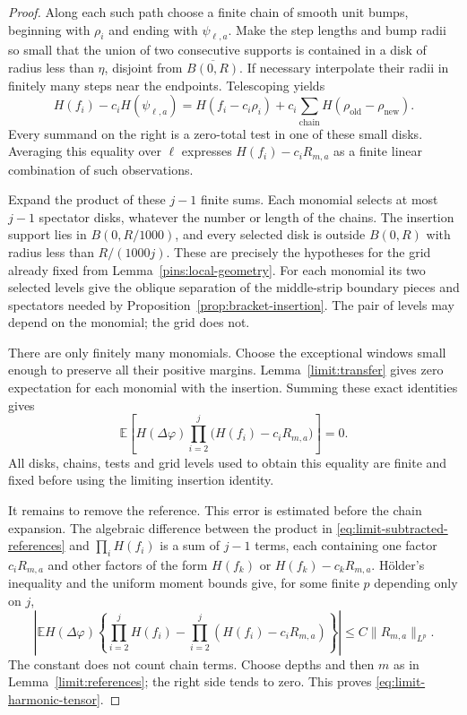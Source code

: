 \documentclass[11pt]{article}
\theoremstyle{definition}
\theoremstyle{remark}
\numberwithin{equation}{section}
\begin{document}
\begin{proof}
Along each such path choose a finite chain of smooth unit bumps,
beginning with \(\rho_i\) and ending with \(\psi_{\ell,a}\).
Make the step lengths and bump radii so small that the union of
two consecutive supports is contained in a disk of radius less
than \(\eta\), disjoint from \(\overline{B(0,R)}\).
If necessary interpolate their radii in finitely many steps near
the endpoints.  Telescoping yields
\[
 H(f_i)-c_iH(\psi_{\ell,a})
  =H(f_i-c_i\rho_i)
    +c_i\sum_{\text{chain}}H(\rho_{\mathrm{old}}-\rho_{\mathrm{new}}).
\]
Every summand on the right is a zero-total test in one of these
small disks.  Averaging this equality over \(\ell\) expresses
\(H(f_i)-c_iR_{m,a}\) as a finite linear combination of such
observations.

Expand the product of these \(j-1\) finite sums.  Each monomial
selects at most \(j-1\) spectator disks, whatever the number or
length of the chains.  The insertion support lies in
\(B(0,R/1000)\), and every selected disk is outside \(B(0,R)\)
with radius less than \(R/(1000j)\).  These are precisely the
hypotheses for the grid already fixed from
Lemma~\ref{pins:local-geometry}.  For each monomial its two selected
levels give the oblique separation of the middle-strip boundary
pieces and spectators needed by Proposition~\ref{prop:bracket-insertion}.
The pair of levels may depend on the monomial; the grid does not.

There are only finitely many monomials.  Choose the exceptional windows
small enough to preserve all their positive margins.
Lemma~\ref{limit:transfer} gives zero expectation for each monomial
with the insertion.  Summing these exact identities gives
\begin{equation}
 \mathbb E\left[H(\Delta\varphi)
              \prod_{i=2}^j\bigl(H(f_i)-c_iR_{m,a}\bigr)\right]=0.
 \label{eq:limit-subtracted-references}
\end{equation}
All disks, chains, tests and grid levels used to obtain this equality
are finite and fixed before using the limiting insertion identity.

It remains to remove the reference.  This error is estimated before
the chain expansion.  The algebraic difference between the product
in \eqref{eq:limit-subtracted-references} and \(\prod_iH(f_i)\)
is a sum of \(j-1\) terms, each containing one factor \(c_iR_{m,a}\)
and other factors of the form \(H(f_k)\) or
\(H(f_k)-c_kR_{m,a}\).  H\"older's inequality and the uniform
moment bounds give, for some finite \(p\) depending only on \(j\),
\[
 \left|\mathbb E H(\Delta\varphi)
       \left\{\prod_{i=2}^jH(f_i)
        -\prod_{i=2}^j(H(f_i)-c_iR_{m,a})\right\}\right|
       \le C\|R_{m,a}\|_{L^p}.
\]
The constant does not count chain terms.  Choose depths and then
\(m\) as in Lemma~\ref{limit:references}; the right side tends to
zero.  This proves \eqref{eq:limit-harmonic-tensor}.


\end{proof}
\end{document}
